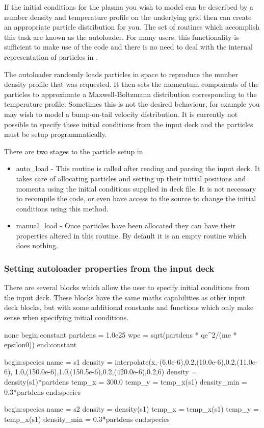 If the initial conditions for the plasma you wish to model can be described
by a number density and temperature profile on the underlying grid then
{\EPOCH} can create an appropriate particle distribution for you. The
set of routines which accomplish this task are known as the autoloader.
For many users, this functionality is sufficient to make use of the
code and there is no need to deal with the internal representation of
particles in {\EPOCH}.

The autoloader randomly loads particles in space to reproduce the number
density profile that was requested. It then sets the momentum components
of the particles to approximate a Maxwell-Boltzmann distribution
corresponding to the temperature profile. Sometimes this is not the
desired behaviour, for example you may wish to model a bump-on-tail
velocity distribution. It is currently not possible to specify these
initial conditions from the input deck and the particles must be setup
programmatically.

There are two stages to the particle setup in {\EPOCH} 

\begin{itemize}
\item auto\_load - This routine is called after reading and parsing the
  input deck. It takes care of allocating particles and setting up their
  initial positions and momenta using the initial conditions supplied in
  deck file.
  It is not necessary to recompile the code, or even have
  access to the source to change the initial conditions using this method.
\item manual\_load - Once particles have been allocated they can have their
  properties altered in this routine. By default it is an empty routine
  which does nothing.
\end{itemize}

\subsubsection{Setting autoloader properties from the input deck}
There are several blocks which allow the user to specify initial conditions
from the input deck. These blocks have the same maths capabilities as other
input deck blocks, but with some additional constants and functions which
only make sense when specifying initial conditions.\\

\begin{nbboxverbatim}{none}
begin:constant
   partdens = 1.0e25
   wpe = sqrt(partdens * qe^2/(me * epsilon0))
end:constant

begin:species
   name = s1
   density = interpolate(x,-(6.0e-6),0.2,(10.0e-6),0.2,(11.0e-6),
            1.0,(150.0e-6),1.0,(150.5e-6),0.2,(420.0e-6),0.2,6)
   density = density(s1)*partdens
   temp_x = 300.0
   temp_y = temp_x(s1)
   density_min = 0.3*partdens
end:species

begin:species
   name = s2
   density = density(s1)
   temp_x = temp_x(s1)
   temp_y = temp_x(s1)
   density_min = 0.3*partdens
end:species
\end{nbboxverbatim}

